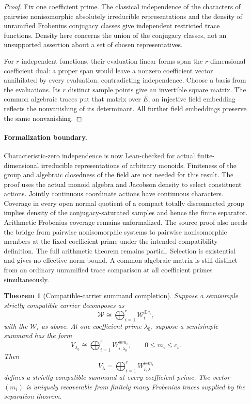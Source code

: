 \documentclass[11pt]{article}
\newtheorem{theorem}{Theorem}[section]
\theoremstyle{definition}
\theoremstyle{remark}
\begin{document}
\begin{proof}
Fix one coefficient prime. The classical independence of the characters of
pairwise nonisomorphic absolutely irreducible representations and the density
of unramified Frobenius conjugacy classes give independent restricted trace
functions. Density here concerns the union of the conjugacy classes, not an
unsupported assertion about a set of chosen representatives.

For $r$ independent functions, their evaluation linear forms span the
$r$-dimensional coefficient dual: a proper span would leave a nonzero
coefficient vector annihilated by every evaluation, contradicting independence.
Choose a basis from the evaluations. Its $r$ distinct sample points give an
invertible square matrix. The common algebraic traces put that matrix over
$E$; an injective field embedding reflects the nonvanishing of its determinant.
All further field embeddings preserve the same nonvanishing.
\end{proof}

\paragraph{Formalization boundary.}
Characteristic-zero independence is now Lean-checked for actual finite-dimensional
irreducible representations of arbitrary monoids. Finiteness of the group and
algebraic closedness of the field are not needed for this result. The proof
uses the actual monoid algebra and Jacobson density to select constituent
actions. Jointly continuous coordinate actions have continuous characters.
Coverage in every open normal quotient of a compact totally disconnected group
implies density of the conjugacy-saturated samples and hence the finite separator.
Arithmetic Frobenius coverage remains unformalized. The source proof also needs
the bridge from pairwise nonisomorphic systems to pairwise nonisomorphic members
at the fixed coefficient prime under the intended compatibility definition.
The full arithmetic theorem remains partial. Selection is existential and gives
no effective norm bound. A common algebraic matrix is still distinct from an
ordinary unramified trace comparison at all coefficient primes simultaneously.

\begin{theorem}[Compatible-carrier summand completion]
Suppose a semisimple strictly compatible carrier decomposes as
\[
\mathscr W
\cong
\bigoplus_{i=1}^{r}
\mathscr W_i^{\oplus c_i},
\]
with the \(\mathscr W_i\) as above.  At one coefficient prime \(\lambda_0\), suppose a semisimple summand has the form
\[
V_{\lambda_0}
\cong
\bigoplus_{i=1}^{r}
W_{i,\lambda_0}^{\oplus m_i},
\qquad
0\le m_i\le c_i.
\]
Then
\[
\boxed{
V_\lambda
=
\bigoplus_{i=1}^{r}
W_{i,\lambda}^{\oplus m_i}
}
\]
defines a strictly compatible summand at every coefficient prime.  The vector \((m_i)\) is uniquely recoverable from finitely many Frobenius traces supplied by the separation theorem.
\end{theorem}
\end{document}
